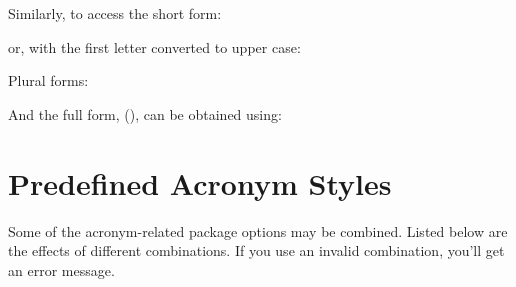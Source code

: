\documentclass[report]{nlctdoc}
\begin{document}
Similarly, to access the short form:
\begin{definition}[\DescribeMacro{\glsentryshort}]
\end{definition}
or, with the first letter converted to upper case:
\begin{definition}[\DescribeMacro{\Glsentryshort}]
\end{definition}
Plural forms:
\begin{definition}[\DescribeMacro{\glsentryshortpl}]
\end{definition}
\begin{definition}[\DescribeMacro{\Glsentryshortpl}]
\end{definition}

And the full form,  (), can be obtained
using:
\begin{definition}[\DescribeMacro{\glsentryfull}]
\end{definition}
\begin{definition}[\DescribeMacro{\Glsentryfull}]
\end{definition}
\begin{definition}[\DescribeMacro{\glsentryfullpl}]
\end{definition}
\begin{definition}[\DescribeMacro{\Glsentryfullpl}]
\end{definition}

\section{Predefined Acronym Styles}
\label{sec:predefinedacrstyles}

Some of the acronym-related package options may be combined. Listed
below are the effects of different combinations. If you use an
invalid combination, you'll get an error message.
\end{document}
